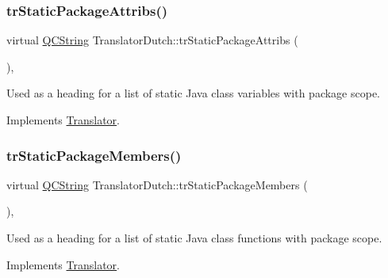 \mbox{\label{class_translator_dutch_acff571f657256c68acf341b3f0719959}} 
\subsubsection{\texorpdfstring{trStaticPackageAttribs()}{trStaticPackageAttribs()}}
{\footnotesize\ttfamily virtual \mbox{\hyperlink{class_q_c_string}{Q\+C\+String}} Translator\+Dutch\+::tr\+Static\+Package\+Attribs (\begin{DoxyParamCaption}{ }\end{DoxyParamCaption})\hspace{0.3cm}{\ttfamily [inline]}, {\ttfamily [virtual]}}

Used as a heading for a list of static Java class variables with package scope. 

Implements \mbox{\hyperlink{class_translator}{Translator}}.

\mbox{\label{class_translator_dutch_a2a3387dc165af561aefef83e0f5b3d4d}} 
\subsubsection{\texorpdfstring{trStaticPackageMembers()}{trStaticPackageMembers()}}
{\footnotesize\ttfamily virtual \mbox{\hyperlink{class_q_c_string}{Q\+C\+String}} Translator\+Dutch\+::tr\+Static\+Package\+Members (\begin{DoxyParamCaption}{ }\end{DoxyParamCaption})\hspace{0.3cm}{\ttfamily [inline]}, {\ttfamily [virtual]}}

Used as a heading for a list of static Java class functions with package scope. 

Implements \mbox{\hyperlink{class_translator}{Translator}}.

\mbox{\label{class_translator_dutch_a8903fb6229a9c0ff86f762476a0c05f5}} 
